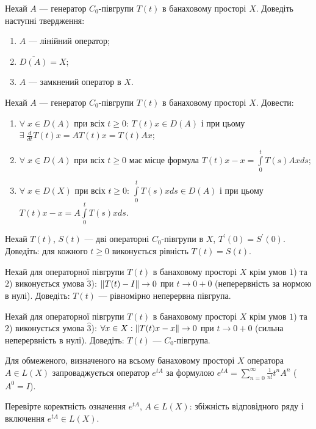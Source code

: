 \begin{exercise}
    Нехай $A$ --- генератор $C_0$-півгрупи $T(t)$ в банаховому просторі $X$. Доведіть наступні твердження:
    \begin{enumerate}
        \item $A$ --- лінійний оператор;
        \item $\overline{D(A)} = X$;
        \item $A$ --- замкнений оператор в $X$.
    \end{enumerate}
\end{exercise}

\begin{exercise}
    Нехай $A$ --- генератор $C_0$-півгрупи $T(t)$ в банаховому просторі $X$. Довести:
    \begin{enumerate}
        \item $\forall \; x \in D(A)$ при всіх $t \geq 0$: $T(t)x \in D(A)$ і при цьому $\exists \; \frac{d}{dt} T(t)x = A T(t)x = T(t) Ax$;
        \item $\forall \; x \in D(A)$ при всіх $t \geq 0$ має місце формула $T(t)x - x = \int\limits_0^t T(s) Ax ds$;
        \item $\forall \; x \in D(X)$ при всіх $t \geq 0$: $\int\limits_0^t T(s)x ds \in D(A)$ і при цьому $T(t)x - x = A \int\limits_0^t T(s)x ds$.
    \end{enumerate}
\end{exercise}

\begin{exercise}
    Нехай $T(t)$, $S(t)$ --- дві операторні $C_0$-півгрупи в $X$, $T^\prime(0) = S^\prime(0)$. Доведіть:
    для кожного $t \geq 0$ виконується рівність $T(t) = S(t)$. 
\end{exercise}

\begin{exercise}
    Нехай для операторної півгрупи $T(t)$ в банаховому просторі $X$ крім умов
    $1$) та $2$) виконується умова $\tilde{3}$): $\left\lVert T(t) - I\right\rVert \to 0$ при $t\to 0 + 0$ (неперервність за нормою в нулі).
    Доведіть: $T(t)$ --- рівномірно неперервна півгрупа.
\end{exercise}

\begin{exercise}
    Нехай для операторної півгрупи $T(t)$ в банаховому просторі $X$ крім умов
    $1$) та $2$) виконується умова $\hat{3}$): $\forall x \in X : \left\lVert T(t)x - x\right\rVert \to 0$ при $t\to 0 + 0$ (сильна неперервність в нулі).
    Доведіть: $T(t)$ --- $C_0$-півгрупа.
\end{exercise}

\begin{theory}
    Для обмеженого, визначеного на всьому банаховому просторі $X$ оператора
    $A \in L(X)$ запроваджується оператор $e^{tA}$ за формулою
    $e^{tA} = \sum\limits_{n=0}^{\infty} \frac{1}{n!} t^n A^n$ ($A^0 = I$).
\end{theory}

\begin{exercise}
    Перевірте коректність означення $e^{tA}$, $A \in L(X)$:
    збіжність відповідного ряду і включення $e^{tA} \in L(X)$.
\end{exercise}